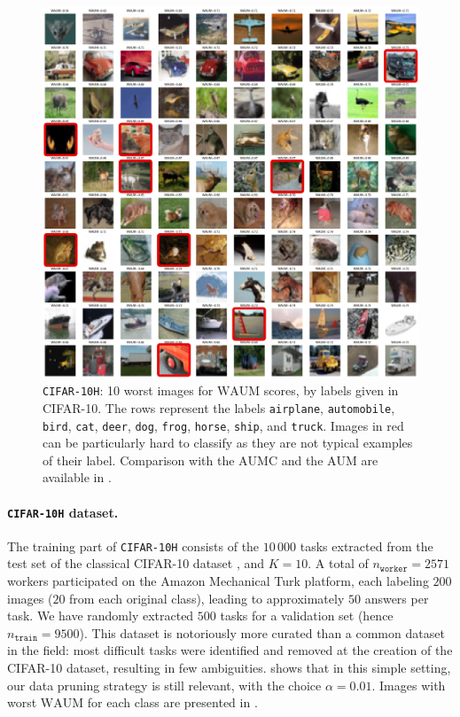\begin{figure}[tbh]
    \centering
    \includegraphics[width=0.9\columnwidth]{images/lowest_waum_C10H_yang_Yang_True_red.pdf}
    \caption{\texttt{CIFAR-10H}: 10 worst images for $\mathrm{WAUM}$ scores, by labels given in CIFAR-10. The rows represent the labels \texttt{airplane}, \texttt{automobile}, \texttt{bird}, \texttt{cat}, \texttt{deer}, \texttt{dog}, \texttt{frog}, \texttt{horse}, \texttt{ship}, and \texttt{truck}. Images in red can be particularly hard to classify as they are not typical examples of their label. Comparison with the $\mathrm{AUMC}$ and the $\mathrm{AUM}$ are available in  .}
    \label{fig:worse_C10H}
\end{figure}

\paragraph*{\texttt{CIFAR-10H} dataset.} The training part of \texttt{CIFAR-10H} consists of the $10\,000$ tasks extracted from the test set of the classical CIFAR-10 dataset \citep{krizhevsky2009learning}, and $K=10$.
A total of $n_\texttt{worker}=2571$ workers participated on the Amazon Mechanical Turk platform, each labeling $200$ images ($20$ from each original class), leading to approximately $50$ answers per task.
We have randomly extracted $500$ tasks for a validation set (hence $n_{\texttt{train}}=9500$).
This dataset is notoriously more curated \citep{aitchison2020statistical} than a common dataset in the field: most difficult tasks were identified and removed at the creation of the CIFAR-10 dataset, resulting in few ambiguities.
 shows that in this simple setting, our data pruning strategy is still relevant, with the choice $\alpha=0.01$. Images with worst $\mathrm{WAUM}$ for each class are presented in .

